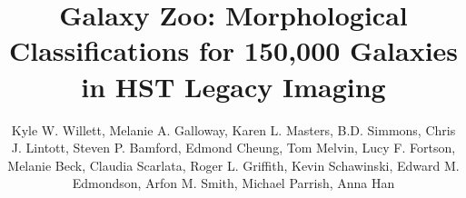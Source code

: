 \documentclass[twocolumn]{aastex6}
\begin{document}

\title{Galaxy Zoo: Morphological Classifications for 150,000 Galaxies in HST Legacy Imaging}

\author{Kyle W. Willett, Melanie A. Galloway, Karen L. Masters, B.D. Simmons, Chris J. Lintott, Steven P. Bamford, Edmond Cheung, Tom Melvin, Lucy F. Fortson, Melanie Beck, Claudia Scarlata, Roger L. Griffith, Kevin Schawinski, Edward M. Edmondson, Arfon M. Smith, Michael Parrish, Anna Han
}
%
\end{document}
